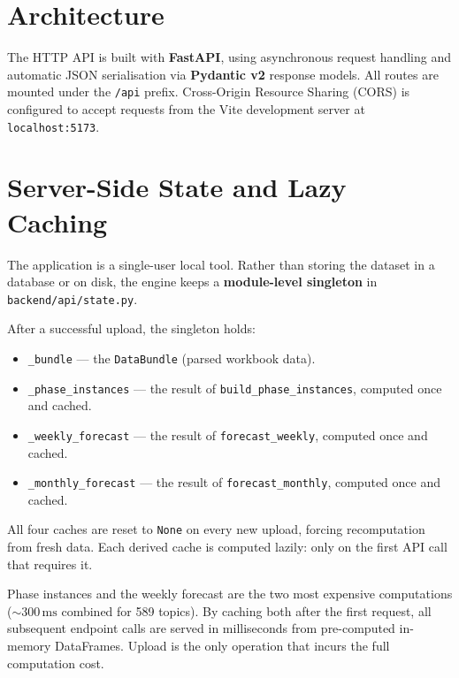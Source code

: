 \documentclass[12pt,a4paper]{report}
\begin{document}
\section{Architecture}

The HTTP API is built with \textbf{FastAPI}, using asynchronous request
handling and automatic JSON serialisation via \textbf{Pydantic v2}
response models. All routes are mounted under the \texttt{/api} prefix.
Cross-Origin Resource Sharing (CORS) is configured to accept requests
from the Vite development server at \texttt{localhost:5173}.

\section{Server-Side State and Lazy Caching}
\label{sec:state}

The application is a single-user local tool. Rather than storing the
dataset in a database or on disk, the engine keeps a \textbf{module-level
singleton} in \texttt{backend/api/state.py}.

After a successful upload, the singleton holds:
\begin{itemize}
  \item \texttt{\_bundle} --- the \texttt{DataBundle} (parsed workbook data).
  \item \texttt{\_phase\_instances} --- the result of
        \texttt{build\_phase\_instances}, computed once and cached.
  \item \texttt{\_weekly\_forecast} --- the result of
        \texttt{forecast\_weekly}, computed once and cached.
  \item \texttt{\_monthly\_forecast} --- the result of
        \texttt{forecast\_monthly}, computed once and cached.
\end{itemize}

All four caches are reset to \texttt{None} on every new upload, forcing
recomputation from fresh data. Each derived cache is computed lazily:
only on the first API call that requires it.

\begin{tcolorbox}[notebox, title={Why lazy caching?}]
  Phase instances and the weekly forecast are the two most expensive
  computations (${\sim}300\,\text{ms}$ combined for 589 topics). By caching
  both after the first request, all subsequent endpoint calls are
  served in milliseconds from pre-computed in-memory DataFrames.
  Upload is the only operation that incurs the full computation cost.
\end{tcolorbox}
\end{document}
